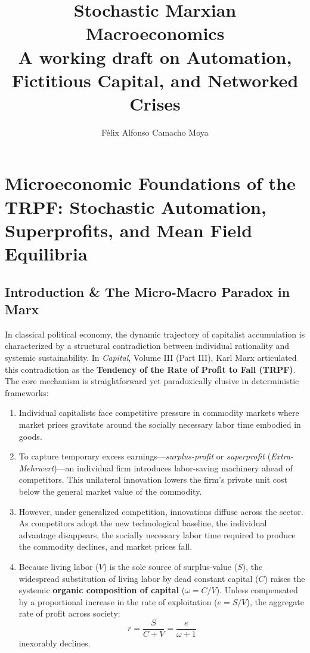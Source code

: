 \documentclass[11pt,letterpaper]{report}
\title{Stochastic Marxian Macroeconomics\\[0.6em]\large A working draft on Automation, Fictitious Capital, and Networked Crises}
\author{Félix Alfonso Camacho Moya}
\date{}
\begin{document}
\maketitle
\begingroup
\small
\setlength{\parskip}{0pt}
\tableofcontents
\endgroup
\clearpage
\chapter{Microeconomic Foundations of the TRPF: Stochastic Automation, Superprofits, and Mean Field Equilibria}
\section{Introduction \& The Micro-Macro Paradox in Marx}
In classical political economy, the dynamic trajectory of capitalist accumulation is characterized by a structural contradiction between individual rationality and systemic sustainability. In \emph{Capital}, Volume III (Part III), Karl Marx articulated this contradiction as the \textbf{Tendency of the Rate of Profit to Fall (TRPF)}. The core mechanism is straightforward yet paradoxically elusive in deterministic frameworks:

\begin{enumerate}
\item Individual capitalists face competitive pressure in commodity markets where market prices gravitate around the socially necessary labor time embodied in goods.
\item To capture temporary excess earnings---\emph{surplus-profit} or \emph{superprofit} (\emph{Extra-Mehrwert})---an individual firm introduces labor-saving machinery ahead of competitors. This unilateral innovation lowers the firm's private unit cost below the general market value of the commodity.
\item However, under generalized competition, innovations diffuse across the sector. As competitors adopt the new technological baseline, the individual advantage disappears, the socially necessary labor time required to produce the commodity declines, and market prices fall.
\item Because living labor ($V$) is the sole source of surplus-value ($S$), the widespread substitution of living labor by dead constant capital ($C$) raises the systemic \textbf{organic composition of capital} ($\omega =C/V$). Unless compensated by a proportional increase in the rate of exploitation ($e=S/V$), the aggregate rate of profit across society:
\[
r=\frac{S}{C+V}=\frac{e}{\omega +1}
\]
inexorably declines.
\end{enumerate}
\end{document}
